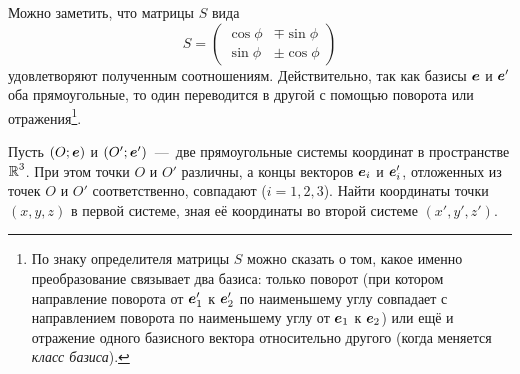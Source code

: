 \documentclass[a4paper,12pt]{article}
\begin{document}
\begin{solution}
    Можно заметить, что матрицы $S$ вида
    \[
      S = \begin{pmatrix}
        \cos \phi & \mp \sin \phi\\
        \sin \phi & \pm \cos \phi
      \end{pmatrix}
    \]
    удовлетворяют полученным соотношениям.
    Действительно, так как базисы $\boldsymbol e$ и $\boldsymbol e'$ оба прямоугольные, то один переводится в другой с помощью поворота или отражения\footnote{По знаку определителя матрицы $S$ можно сказать о том, какое именно преобразование связывает два базиса: только поворот (при котором направление поворота от $\boldsymbol e_1'$ к $\boldsymbol e_2'$ по наименьшему углу совпадает с направлением поворота по наименьшему углу от $\boldsymbol e_1$ к $\boldsymbol e_2$) или ещё и отражение одного базисного вектора относительно другого (когда меняется \emph{класс базиса}).}.
  \end{solution}
  
  
  \begin{problem}[4.30]
    Пусть $(O; \boldsymbol e)$ и $(O'; \boldsymbol e')$~---~две прямоугольные системы координат в пространстве $\operatorname{\mathbb R}^3$.
    При этом точки $O$ и $O'$ различны, а концы векторов $\boldsymbol e_i$ и $\boldsymbol e_i'$, отложенных из точек $O$ и $O'$ соответственно, совпадают ($i = 1, 2, 3$).
    Найти координаты точки $(x, y, z)$ в первой системе, зная её координаты во второй системе $(x', y', z')$.
  \end{problem}
  
\end{document}
